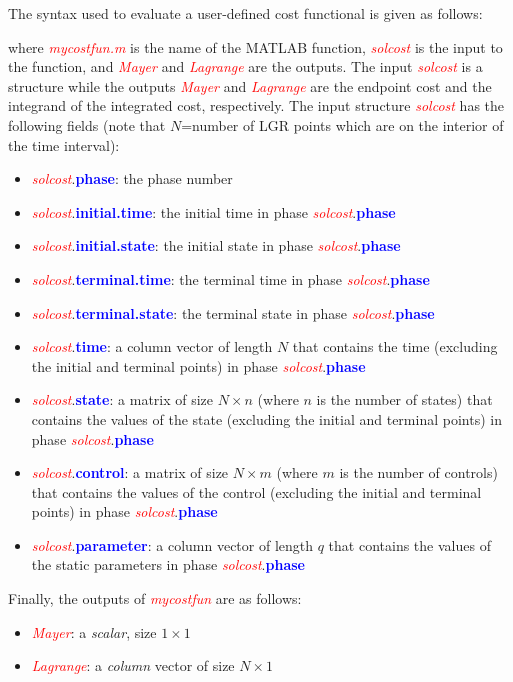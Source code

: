 \documentclass[10pt]{article}
\newcommand{\bfblue}[1]{\textcolor{blue}{\bf #1}}
\newcommand{\slred}[1]{\textcolor{red}{\sl #1}}
\begin{document}
The syntax used to evaluate a user-defined cost functional is given as follows:
\begin{center}
\end{center}
{\noindent}where \slred{mycostfun.m} is the name of the MATLAB function,
\slred{solcost} is the input to the function, and
\slred{Mayer} and \slred{Lagrange} are the outputs.  The input
\slred{solcost} is a structure while the outputs
\slred{Mayer} and \slred{Lagrange} are the endpoint cost and the
integrand of the integrated cost, respectively.  The input structure
\slred{solcost} has the following fields (note that $N$=number of LGR points which are on the interior of the time interval):
\begin{itemize}
  \item \slred{solcost}.\bfblue{phase}:  the phase number
  \item \slred{solcost}.\bfblue{initial.time}:  the initial time in phase \slred{solcost}.\bfblue{phase}
  \item \slred{solcost}.\bfblue{initial.state}:  the initial state in phase \slred{solcost}.\bfblue{phase}
  \item \slred{solcost}.\bfblue{terminal.time}:  the terminal time in phase \slred{solcost}.\bfblue{phase}
  \item \slred{solcost}.\bfblue{terminal.state}:  the terminal state in phase \slred{solcost}.\bfblue{phase}
  \item \slred{solcost}.\bfblue{time}:  a column vector of length $N$ that
    contains the time (excluding the initial and terminal points) in
    phase \slred{solcost}.\bfblue{phase}
  \item \slred{solcost}.\bfblue{state}:  a matrix of size $N\times n$ (where $n$
    is the number of states) that contains the values of the state (excluding the initial and
    terminal points) in phase \slred{solcost}.\bfblue{phase}
  \item \slred{solcost}.\bfblue{control}:  a matrix of size $N\times m$ (where $m$
    is the number of controls) that contains the values of the control (excluding the initial and
    terminal points) in phase \slred{solcost}.\bfblue{phase}
  \item \slred{solcost}.\bfblue{parameter}:  a column vector of length $q$ that contains the values of the static parameters in phase \slred{solcost}.\bfblue{phase}
\end{itemize}
Finally, the outputs of \slred{mycostfun} are as follows:
\begin{itemize}
  \item \slred{Mayer}: a {\em scalar}, \ie size $1\times 1$
  \item \slred{Lagrange}: a {\em column} vector of size $N\times 1$
\end{itemize}
\end{document}
